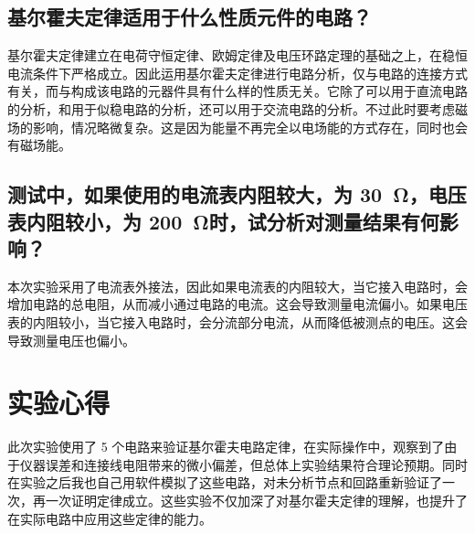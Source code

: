 \documentclass[a4paper,utf8]{article}
\begin{document}
    \subsection{基尔霍夫定律适用于什么性质元件的电路？}
        基尔霍夫定律建立在电荷守恒定律、欧姆定律及电压环路定理的基础之上，在稳恒电流条件下严格成立。因此运用基尔霍夫定律进行电路分析，仅与电路的连接方式有关，而与构成该电路的元器件具有什么样的性质无关。它除了可以用于直流电路的分析，和用于似稳电路的分析，还可以用于交流电路的分析。不过此时要考虑磁场的影响，情况略微复杂。这是因为能量不再完全以电场能的方式存在，同时也会有磁场能。
    \subsection{测试中，如果使用的电流表内阻较大，为 \SI{30}{\ohm}，电压表内阻较小，为 \SI{200}{\ohm}时，试分析对测量结果有何影响？}
        本次实验采用了电流表外接法，因此如果电流表的内阻较大，当它接入电路时，会增加电路的总电阻，从而减小通过电路的电流。这会导致测量电流偏小。如果电压表的内阻较小，当它接入电路时，会分流部分电流，从而降低被测点的电压。这会导致测量电压也偏小。
\section{实验心得}
    此次实验使用了 5 个电路来验证基尔霍夫电路定律，在实际操作中，观察到了由于仪器误差和连接线电阻带来的微小偏差，但总体上实验结果符合理论预期。同时在实验之后我也自己用软件模拟了这些电路，对未分析节点和回路重新验证了一次，再一次证明定律成立。这些实验不仅加深了对基尔霍夫定律的理解，也提升了在实际电路中应用这些定律的能力。
    
\end{document}
